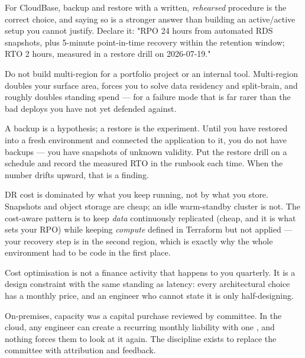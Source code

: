  For CloudBase, backup and restore with a written, \emph{rehearsed} procedure is the correct choice, and saying so is a stronger answer than building an active/active setup you cannot justify. Declare it: "RPO 24 hours from automated RDS snapshots, plus 5-minute point-in-time recovery within the retention window; RTO 2 hours, measured in a restore drill on 2026-07-19."

 Do not build multi-region for a portfolio project or an internal tool. Multi-region doubles your surface area, forces you to solve data residency and split-brain, and roughly doubles standing spend --- for a failure mode that is far rarer than the bad deploys you have not yet defended against.

\begin{drtip}
A backup is a hypothesis; a restore is the experiment. Until you have restored into a fresh environment and connected the application to it, you do not have backups --- you have snapshots of unknown validity. Put the restore drill on a schedule and record the measured RTO in the runbook each time. When the number drifts upward, that is a finding.
\end{drtip}

\begin{costnote}
DR cost is dominated by what you keep running, not by what you store. Snapshots and object storage are cheap; an idle warm-standby cluster is not. The cost-aware pattern is to keep \emph{data} continuously replicated (cheap, and it is what sets your RPO) while keeping \emph{compute} defined in Terraform but not applied --- your recovery step is  in the second region, which is exactly why the whole environment had to be code in the first place.
\end{costnote}


 Cost optimisation is not a finance activity that happens to you quarterly. It is a design constraint with the same standing as latency: every architectural choice has a monthly price, and an engineer who cannot state it is only half-designing.

 On-premises, capacity was a capital purchase reviewed by committee. In the cloud, any engineer can create a recurring monthly liability with one , and nothing forces them to look at it again. The discipline exists to replace the committee with attribution and feedback.

